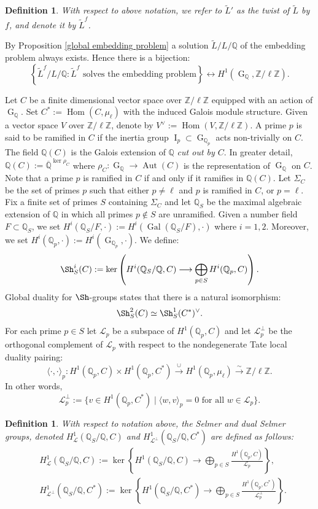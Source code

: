 \documentclass[11pt,reqno]{amsart}
\newtheorem{definition}[theorem]{Definition}
\newcommand{\Z}{\mathbb{Z}}
\newcommand{\Q}{\mathbb{Q}}
\newcommand{\cL}{\mathcal{L}}
\newcommand{\op}[1]{\operatorname{#1}}
\numberwithin{equation}{section}
\begin{document}
\begin{definition}\label{defn of twist} With respect to above notation, we refer to $\widetilde{L}'$ as the \emph{twist} of $\widetilde{L}$ by $f$, and denote it by $\widetilde{L}^f$.
\end{definition}
By Proposition \ref{global embedding problem} a solution $\widetilde{L}/L/\Q$ of the embedding problem always exists. Hence there is a bijection:
\[\left\{\widetilde{L}^f/L/\Q : \widetilde{L}^f\text{ solves the embedding problem} \right\}\leftrightarrow H^1(\op{G}_{\Q}, \Z/\ell\Z). \]
\par Let $C$ be a finite dimensional vector space over $\Z/\ell \Z$ equipped with an action of $\op{G}_{\Q}$. Set $C^*:=\op{Hom}\left(C, \mu_\ell\right)$ with the induced Galois module structure. Given a vector space $V$ over $\Z/\ell \Z$, denote by $V^\vee:=\op{Hom}(V, \Z/\ell\Z)$. A prime $p$ is said to be ramified in $C$ if the inertia group $\op{I}_p\subset \op{G}_{\Q_p}$ acts non-trivially on $C$. The field $\Q(C)$ is the Galois extension of $\Q$ \emph{cut out by $C$}. In greater detail, $\Q(C):=\overline{\Q}^{\op{ker}\rho_C}$ where $\rho_C: \op{G}_{\Q}\rightarrow \op{Aut}(C)$ is the representation of $\op{G}_{\Q}$ on $C$. Note that a prime $p$ is ramified in $C$ if and only if it ramifies in $\Q(C)$. Let $\Sigma_C$ be the set of primes $p$ such that either $p\neq \ell$ and $p$ is ramified in $C$, or $p=\ell$. Fix a finite set of primes $S$ containing $\Sigma_C$ and let $\Q_S$ be the maximal algebraic extension of $\Q$ in which all primes $p\notin S$ are unramified. Given a number field $F\subset \Q_S$, we set $H^i(\Q_S/F, \cdot):=H^i(\op{Gal}(\Q_S/F), \cdot)$ where $i=1,2$. Moreover, we set $H^i(\Q_p, \cdot):=H^i(\op{G}_{\Q_p}, \cdot)$. We define:
\[\Sh^i_S(C):=\op{ker}\left( H^i(\Q_S/\Q, C)\longrightarrow \bigoplus_{p\in S} H^i(\Q_p, C)\right).\] Global duality for $\Sh$-groups \cite[Theorem 8.6.7]{NSW} states that there is a natural isomorphism:
\begin{equation}\label{PT duality}\Sh^2_S(C)\simeq \Sh^1_S(C^*)^\vee.\end{equation}
For each prime $p\in S$ let $\cL_p$ be a subspace of $H^1(\Q_p, C)$ and let $\cL_p^\perp$ be the orthogonal complement of $\cL_p$ with respect to the nondegenerate Tate local duality pairing:
\[\langle \cdot, \cdot \rangle_p : H^1(\Q_p, C)\times H^1(\Q_p, C^*)\xrightarrow{\cup} H^1(\Q_p, \mu_\ell)\xrightarrow{\sim}\Z/\ell \Z. \]
In other words, 
\[\cL_p^\perp:=\{v\in H^1(\Q_p, C^*)\mid \langle w, v\rangle_p=0\text{ for all }w\in \cL_p\}.\]
\begin{definition}\label{defn of Selmer and dual Selmer}
    With respect to notation above, the Selmer and dual Selmer groups, denoted $H^1_{\cL}(\Q_S/\Q, C)$ and $H^1_{\cL^\perp}(\Q_S/\Q, C^*)$ are defined as follows:
    \[\begin{split}
        & H^1_{\cL}(\Q_S/\Q, C):= \op{ker}\left\{ H^1(\Q_S/\Q, C)\longrightarrow \bigoplus_{p\in S} \frac{H^1(\Q_p, C)}{\cL_p}\right\},\\
        & H^1_{\cL^\perp}(\Q_S/\Q, C^*):= \op{ker}\left\{ H^1(\Q_S/\Q, C^*)\longrightarrow \bigoplus_{p\in S} \frac{H^1(\Q_p, C^*)}{\cL_p^\perp}\right\}.\\
    \end{split}\]
\end{definition}
\end{document}
